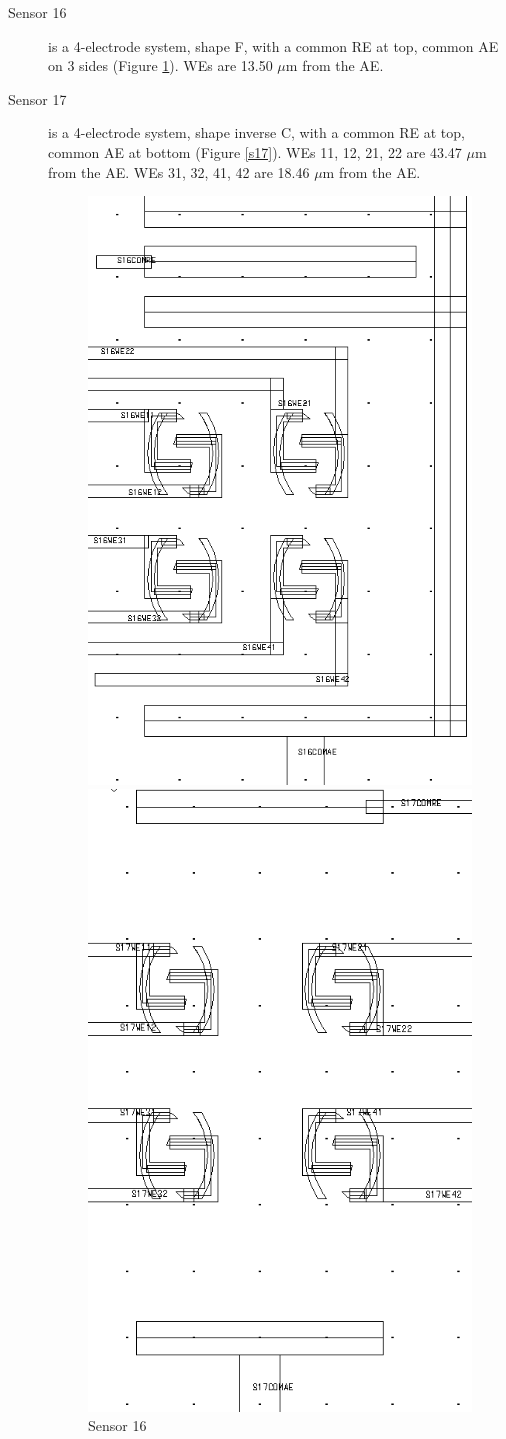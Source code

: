 \begin{description}
\item[Sensor 16] is a 4-electrode system, shape F, with a common RE at top, common AE on 3 sides (Figure \ref{s16}). WEs are 13.50 $\mu \mathrm{m}$ from the AE.
\item[Sensor 17] is a 4-electrode system, shape inverse C, with a common RE at top, common AE at bottom (Figure \ref{s17}). WEs 11, 12, 21, 22 are 43.47 $\mu \mathrm{m}$ from the AE. WEs 31, 32, 41, 42 are 18.46 $\mu \mathrm{m}$ from the AE.

\begin{figure}
	\begin{minipage}{0.5\linewidth}
		\centering
		\includegraphics[width=0.6\linewidth]{figures/s16.png}
		\caption{Sensor 16}
		\label{s16}
	\end{minipage}
	\begin{minipage}{0.5\linewidth}
		\centering
		\includegraphics[width=0.6\linewidth]{figures/s17.png}

\end{minipage}
\end{figure}
\end{description}
